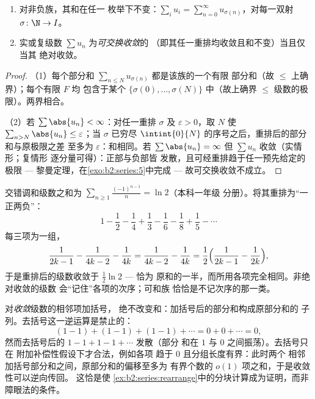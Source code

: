 \begin{theorem}[可和性与次序]\label{thm:b2:series:rearrangement}
\begin{enumerate}
  \item 对非负族，其和在任一
        枚举下不变：$\sum_{i} u_i = \sum_{n=0}^{\infty}
        u_{\sigma(n)}$，对每一双射 $\sigma \colon \N \to I$。
  \item 实或复级数 $\sum u_n$ 为\emph{可交换收敛}的
        （即其任一重排均收敛且和不变）当且仅当其
        绝对收敛。
\end{enumerate}
\end{theorem}

\begin{proof}
（1）每个部分和 $\sum_{n \leq N} u_{\sigma(n)}$ 都是该族的一个有限
部分和（故 $\leq$ 上确界）；每个有限 $F$ 均
包含于某个 $\{\sigma(0), \dots, \sigma(N)\}$ 中（故上确界
$\leq$ 级数的极限）。两界相合。

（2）若 $\sum\abs{u_n} < \infty$：对任一重排 $\sigma$ 及
$\varepsilon > 0$，取 $N$ 使 $\sum_{n > N}\abs{u_n} \leq
\varepsilon$；当 $\sigma$ 已穷尽
$\intint{0}{N}$ 的序号之后，重排后的部分和与原极限之差
至多为 $\varepsilon$：和相同。若 $\sum
\abs{u_n} = \infty$ 但 $\sum u_n$ 收敛（实情形；复情形
逐分量可得）：正部与负部皆
发散，且可经重排趋于任一预先给定的极限
--- 黎曼定理，在\cref{exo:b2:series:5}中完成 ---
故可交换收敛不成立。
\end{proof}

\begin{example}[一个被当场抓获的重排]\label{ex:b2:series:rearrange}
交错调和级数之和为
$\sum_{n\geq1}\frac{(-1)^{n-1}}{n} = \ln 2$（本科一年级
分册）。将其重排为“一正两负”：
\[
1 - \frac12 - \frac14 + \frac13 - \frac16 - \frac18 + \frac15 -
\cdots
\]
每三项为一组，
\[
\frac{1}{2k-1} - \frac{1}{4k-2} - \frac1{4k}
= \frac{1}{4k-2} - \frac{1}{4k}
= \frac12\Bigl(\frac{1}{2k-1} - \frac1{2k}\Bigr),
\]
于是重排后的级数收敛于 $\frac12\ln 2$ --- 恰为
原和的一半，而所用各项完全相同。非绝对收敛的级数
会“记住”各项的次序；可和族
恰恰是不记次序的那一类。
\end{example}

\begin{example}\label{ex:b2:series:grouping}
对\emph{收敛}级数的相邻项加括号，
绝不改变和：加括号后的部分和构成原部分和的
子列。去括号这一逆运算是禁止的：
\[
(1 - 1) + (1 - 1) + (1 - 1) + \cdots = 0 + 0 + \cdots = 0,
\]
然而去括号后的 $1 - 1 + 1 - 1 + \cdots$ 发散（部分
和在 $1$ 与 $0$ 之间振荡）。去括号只在
附加补偿性假设下才合法，例如各项
趋于 $0$ 且分组长度有界：此时两个
相邻加括号部分和之间，原部分和的偏移至多为
有界个数的 $o(1)$ 项之和，于是收敛性可以逆向传回。
这恰是使
\cref{ex:b2:series:rearrange}中的分块计算成为证明，而非
障眼法的条件。
\end{example}

